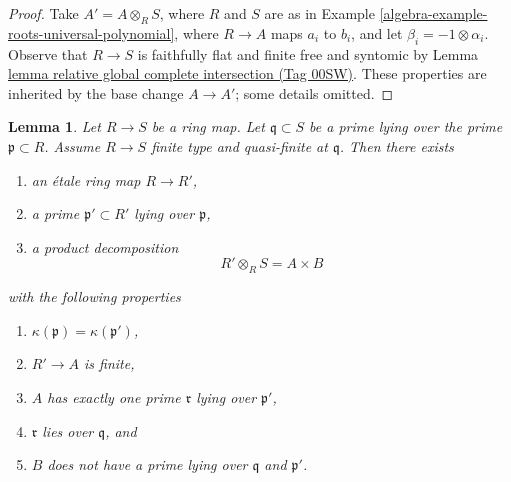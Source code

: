 \documentclass{amsart}
\theoremstyle{plain}
\newtheorem{lemma}[subsection]{Lemma}
\theoremstyle{definition}
\theoremstyle{remark}
\numberwithin{equation}{subsection}
\begin{document}
\begin{proof}
Take $A' = A \otimes_R S$, where $R$ and $S$ are as in
Example \ref{algebra-example-roots-universal-polynomial},
where $R \to A$ maps $a_i$ to $b_i$, and let
$\beta_i = -1 \otimes \alpha_i$. Observe that $R \to S$ is
faithfully flat and finite free and syntomic by
Lemma \href{https://stacks.math.columbia.edu/tag/00SW}{lemma relative global complete intersection (Tag 00SW)}.
These properties are inherited by the base change
$A \to A'$; some details omitted.
\end{proof}


\begin{lemma}
\label{algebra-lemma-etale-makes-quasi-finite-finite-one-prime}
Let $R \to S$ be a ring map.
Let $\mathfrak q \subset S$ be a prime lying over
the prime $\mathfrak p \subset R$.
Assume $R \to S$ finite type and quasi-finite at $\mathfrak q$.
Then there exists
\begin{enumerate}
\item an \'etale ring map $R \to R'$,
\item a prime $\mathfrak p' \subset R'$ lying over $\mathfrak p$,
\item a product decomposition
$$
R' \otimes_R S = A \times B
$$
\end{enumerate}
with the following properties
\begin{enumerate}
\item $\kappa(\mathfrak p) = \kappa(\mathfrak p')$,
\item $R' \to A$ is finite,
\item $A$ has exactly one prime $\mathfrak r$ lying over $\mathfrak p'$,
\item $\mathfrak r$ lies over $\mathfrak q$, and
\item $B$ does not have a prime lying over $\mathfrak q$ and $\mathfrak p'$.
\end{enumerate}
\end{lemma}
\end{document}
